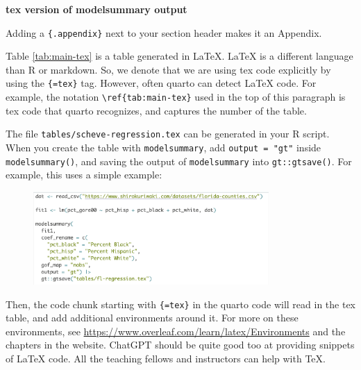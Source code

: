 \documentclass[12pt, ]{article}
\begin{document}
\begin{table}
\caption{\textbf{tex version of modelsummary output}}


\end{table}

Adding a \texttt{\{.appendix\}} next to your section header makes it an
Appendix.

Table \ref{tab:main-tex} is a table generated in LaTeX. LaTeX is a
different language than R or markdown. So, we denote that we are using
tex code explicitly by using the \texttt{\{=tex\}} tag. However, often
quarto can detect LaTeX code. For example, the notation
\texttt{\textbackslash{}ref\{tab:main-tex\}} used in the top of this
paragraph is tex code that quarto recognizes, and captures the number of
the table.

The file \texttt{tables/scheve-regression.tex} can be generated in your
R script. When you create the table with \texttt{modelsummary}, add
\texttt{output\ =\ "gt"} inside \texttt{modelsummary()}, and saving the
output of \texttt{modelsummary} into \texttt{gt::gtsave()}. For example,
this uses a simple example:

\begin{figure}[tbp]

{\centering \includegraphics[width=0.8\textwidth,height=\textheight]{figures/codesnippet.png}

}

\end{figure}

Then, the code chunk starting with \texttt{\{=tex\}} in the quarto code
will read in the tex table, and add additional environments around it.
For more on these environments, see
\url{https://www.overleaf.com/learn/latex/Environments} and the chapters
in the website. ChatGPT should be quite good too at providing snippets
of LaTeX code. All the teaching fellows and instructors can help with
TeX.

\end{document}
